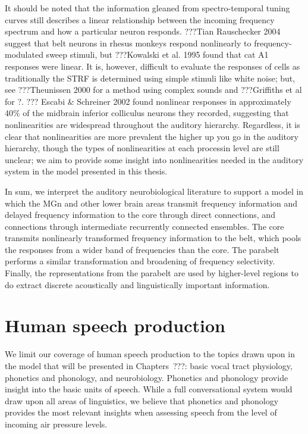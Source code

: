 It should be noted
that the information gleaned from
spectro-temporal tuning curves
still describes a linear relationship
between the incoming frequency spectrum
and how a particular neuron responds.
???Tian Rauschecker 2004
suggest that belt neurons
in rhesus monkeys respond nonlinearly
to frequency-modulated sweep stimuli,
but ???Kowalski et al. 1995
found that cat A1 responses were linear.
It is, however, difficult to evaluate
the responses of cells
as traditionally the STRF
is determined using simple stimuli
like white noise;
but, see ???Theunissen 2000
for a method using complex sounds
and ???Griffiths et al for ?.
??? Escabi \& Schreiner 2002
found nonlinear responses
in approximately 40\%
of the midbrain inferior colliculus
neurons they recorded,
suggesting that nonlinearities
are widespread
throughout the auditory hierarchy.
Regardless, it is clear that
nonlinearities are more prevalent
the higher up you go in the auditory hierarchy,
though the types of nonlinearities
at each processin level are still unclear;
we aim to provide some insight into
nonlinearities needed in the auditory system
in the model presented in this thesis.

In sum, we interpret
the auditory neurobiological literature
to support a model in which
the MGn and other lower brain areas
transmit frequency information
and delayed frequency information
to the core through direct connections,
and connections through intermediate
recurrently connected ensembles.
The core transmits nonlinearly transformed
frequency information to the belt,
which pools the responses from
a wider band of frequencies than the core.
The parabelt performs a similar transformation
and broadening of frequency selectivity.
Finally, the representations from the parabelt
are used by higher-level regions to
do extract discrete
acoustically and linguistically
important information.

\section{Human speech production}

We limit our coverage
of human speech production
to the topics drawn upon
in the model that will be presented
in Chapters~???:
basic vocal tract physiology,
phonetics and phonology,
and neurobiology.
Phonetics and phonology
provide insight into the basic units of speech.
While a full conversational system
would draw upon all areas of linguistics,
we believe that phonetics and phonology
provides the most relevant insights
when assessing speech from the level of
incoming air pressure levels.

